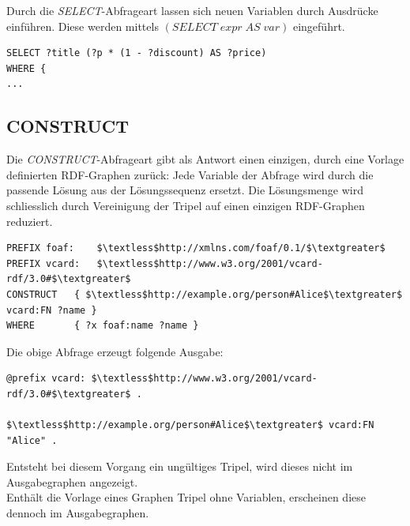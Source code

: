 Durch die \textit{SELECT}-Abfrageart lassen sich neuen Variablen durch Ausdrücke einführen. Diese werden mittels $(SELECT \; expr \; AS \; var)$ eingeführt.

\begin{lstlisting}
SELECT ?title (?p * (1 - ?discount) AS ?price)
WHERE {
...
\end{lstlisting}


\subsection{CONSTRUCT}
\label{subsec:sparql_abfragearten_construct}
Die \textit{CONSTRUCT}-Abfrageart gibt als Antwort einen einzigen, durch eine Vorlage definierten RDF-Graphen zurück: Jede Variable der Abfrage wird durch die passende Lösung aus der Lösungssequenz ersetzt. Die Lösungsmenge wird schliesslich durch Vereinigung der Tripel auf einen einzigen RDF-Graphen reduziert.

\begin{lstlisting}
PREFIX foaf:    $\textless$http://xmlns.com/foaf/0.1/$\textgreater$
PREFIX vcard:   $\textless$http://www.w3.org/2001/vcard-rdf/3.0#$\textgreater$
CONSTRUCT   { $\textless$http://example.org/person#Alice$\textgreater$ vcard:FN ?name }
WHERE       { ?x foaf:name ?name }
\end{lstlisting}

Die obige Abfrage erzeugt folgende Ausgabe:
\begin{lstlisting}
@prefix vcard: $\textless$http://www.w3.org/2001/vcard-rdf/3.0#$\textgreater$ .

$\textless$http://example.org/person#Alice$\textgreater$ vcard:FN "Alice" .
\end{lstlisting}

Entsteht bei diesem Vorgang ein ungültiges Tripel, wird dieses nicht im Ausgabegraphen angezeigt.\\
Enthält die Vorlage eines Graphen Tripel ohne Variablen, erscheinen diese dennoch im Ausgabegraphen.

